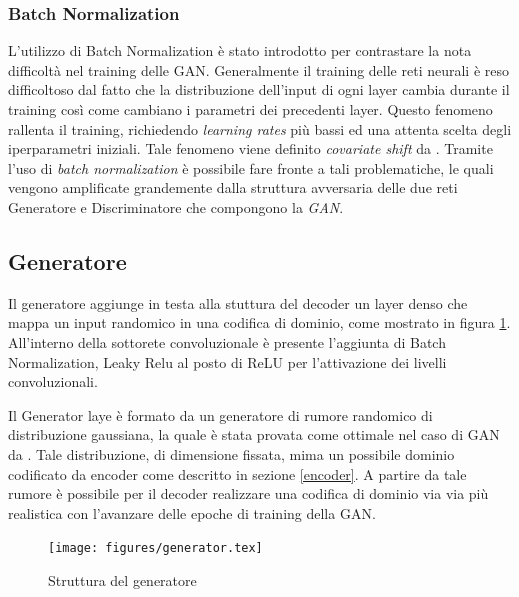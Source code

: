 \subsubsection{Batch Normalization}
L'utilizzo di Batch Normalization è stato introdotto per contrastare la nota difficoltà nel training delle GAN. Generalmente il training delle reti neurali è reso difficoltoso dal fatto che la distribuzione dell'input di ogni layer cambia durante il training così come cambiano i parametri dei precedenti layer. Questo fenomeno rallenta il training, richiedendo \textit{learning rates} più bassi ed una attenta scelta degli iperparametri iniziali. Tale fenomeno viene definito \textit{covariate shift} da \cite{1502.03167}. Tramite l'uso di \textit{batch normalization} è possibile fare fronte a tali problematiche, le quali vengono amplificate grandemente dalla struttura avversaria delle due reti Generatore e Discriminatore che compongono la \textit{GAN}. 

\subsection{Generatore}
\label{generator}
Il generatore aggiunge in testa alla stuttura del decoder un layer denso che mappa un input randomico in una codifica di dominio, come mostrato in figura \ref{fig:generator}. All'interno della sottorete convoluzionale è presente l'aggiunta di Batch Normalization, Leaky Relu al posto di ReLU per l'attivazione dei livelli convoluzionali.

Il Generator laye è formato da un generatore di rumore randomico di distribuzione gaussiana, la quale è stata provata come ottimale nel caso di GAN da \cite{gaussian}. Tale distribuzione, di dimensione fissata, mima un possibile dominio codificato da encoder come descritto in sezione \ref{encoder}. A partire da tale rumore è possibile per il decoder realizzare una codifica di dominio via via più realistica con l'avanzare delle epoche di training della GAN.

\begin{figure}[!ht]
    \centering
	\texttt{[image: figures/generator.tex]}
	\caption{Struttura del generatore}
\label{fig:generator}
\end{figure}

